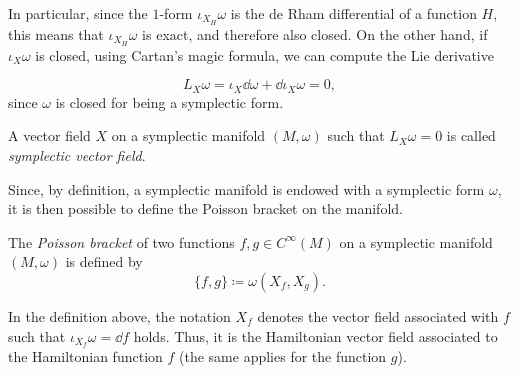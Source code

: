 In particular, since the $1$-form $\iota_{X_H} \omega$ is the de Rham differential of a function $H$, this means that $\iota_{X_H} \omega$ is exact, and therefore also closed.
On the other hand, if $\iota_X \omega$ is closed, using Cartan's magic formula, we can compute the Lie derivative

\begin{equation*}
    L_X \omega = \iota_X \dd \omega + \dd \iota_X \omega = 0,
\end{equation*}
since $\omega$ is closed for being a symplectic form.

\begin{definition}
    A vector field $X$ on a symplectic manifold $(M, \omega)$ such that $L_X \omega = 0$ is called \emph{symplectic vector field}.
\end{definition}

Since, by definition, a symplectic manifold is endowed with a symplectic form $\omega$, it is then possible to define the Poisson bracket on the manifold.
\begin{definition}
    The \emph{Poisson bracket} of two functions $f, g \in C^\infty(M)$ on a symplectic manifold $(M, \omega)$ is defined by
    \begin{equation*}
        \{f, g\} \coloneqq \omega(X_f, X_g) .
    \end{equation*}
\end{definition}
In the definition above, the notation $X_f$ denotes the vector field associated with $f$ such that $\iota_{X_f} \omega = \dd f$ holds.
Thus, it is the Hamiltonian vector field associated to the Hamiltonian function $f$ (the same applies for the function $g$).